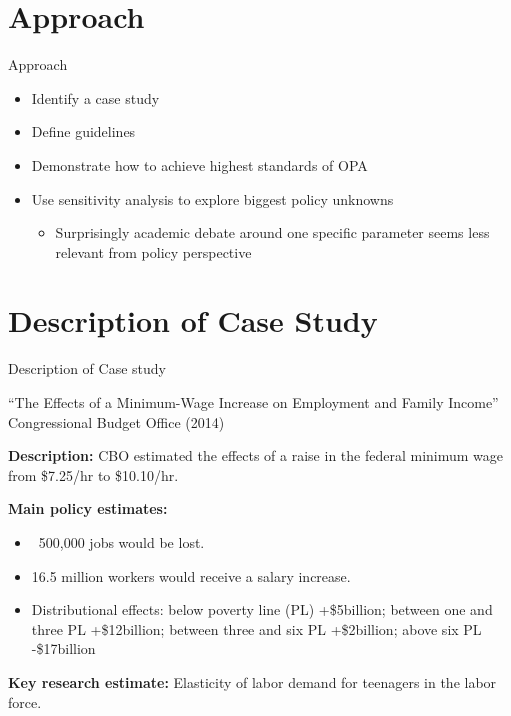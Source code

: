 \documentclass{beamer}
\begin{document}
 \section{Approach}
\begin{frame}{Approach}
\begin{itemize}
\item Identify a case study
\item Define guidelines
\item Demonstrate how to achieve highest standards of OPA
\item Use sensitivity analysis to explore biggest policy unknowns 
\begin{itemize}
\item  Surprisingly academic debate around one specific parameter seems less relevant from policy perspective
\end{itemize}
\end{itemize}
\end{frame} 

\section[Case Study]{Description of Case Study}

\begin{frame}[label =  desc_cs]{Description of Case study}
\begin{center}
``The Effects of a Minimum-Wage Increase on Employment and Family Income'' 
Congressional Budget Office (2014)
\end{center}

\textbf{Description:} CBO estimated the effects of a raise in the federal minimum wage from \$7.25/hr to \$10.10/hr. 


\textbf{Main policy estimates:}
\begin{itemize}
\item ~500,000 jobs would be lost.
\item 16.5 million workers would receive a salary increase. 
\item Distributional effects: below poverty line (PL) +\$5billion; between one and three PL +\$12billion; between three and six PL +\$2billion; above six PL -\$17billion
\end{itemize}

\textbf{Key research estimate:} Elasticity of labor demand for teenagers in the labor force. 
\end{frame}
\end{document}
